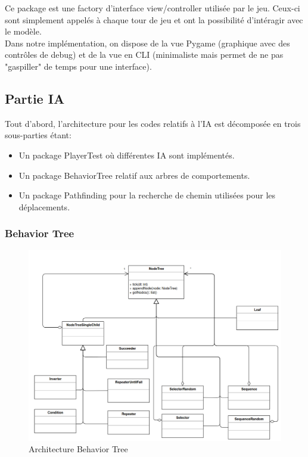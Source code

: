 Ce package est une factory d'interface view/controller utilisée par le jeu. Ceux-ci sont simplement appelés à chaque tour de jeu et ont la possibilité d'intéragir avec le modèle.\\

Dans notre implémentation, on dispose de la vue Pygame (graphique avec des contrôles de debug) et de la vue en CLI (minimaliste mais permet de ne pas "gaspiller" de temps pour une interface).

\newpage
\subsection{Partie IA}
Tout d'abord, l'architecture pour les codes relatifs à l'IA est décomposée en trois sous-parties étant:
\begin{itemize}
    \item Un package PlayerTest où différentes IA sont implémentés.
    \item Un package BehaviorTree relatif aux arbres de comportements.
    \item Un package Pathfinding pour la recherche de chemin utilisées pour les déplacements.
    \\
\end{itemize}{}

\subsubsection{Behavior Tree}

\begin{figure}[H]
    \centering
    \includegraphics[scale=0.3]{data/archi/archi_nodetree.png}
    \caption{Architecture Behavior Tree}
    \label{}
\end{figure}

